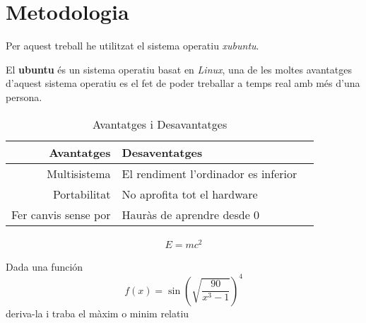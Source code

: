 \chapter{Metodologia}
Per aquest treball he utilitzat el sistema operatiu \textit{xubuntu}\cite{xubuntu}.
\vspace{0.3truecm}

El \textbf{ubuntu} és un sistema operatiu basat en \textit{Linux}, una de les moltes avantatges d'aquest sistema operatiu es el fet de poder treballar a temps real amb més d'una persona.

\begin{table}[h!]
\begin{center}
\begin{tabular}{| r | l | c |}
\hline Avantatges & Desaventatges\\ \hline
\hline Multisistema & El rendiment l'ordinador es inferior \\
\hline Portabilitat & No aprofita tot el hardware \\
\hline Fer canvis sense por & Hauràs de aprendre desde 0 \\ \hline
\end{tabular}
\caption{Avantatges i Desavantatges}
\label{tab:prosicontra}
\end{center}
\end{table}

\begin{align}
  E=mc^2
\end{align}

Dada una función
\begin{equation}
f(x)= \sin(\sqrt{\frac{90}{x^3-1}})^4
\end{equation}
deriva-la i traba el màxim o minim relatiu

